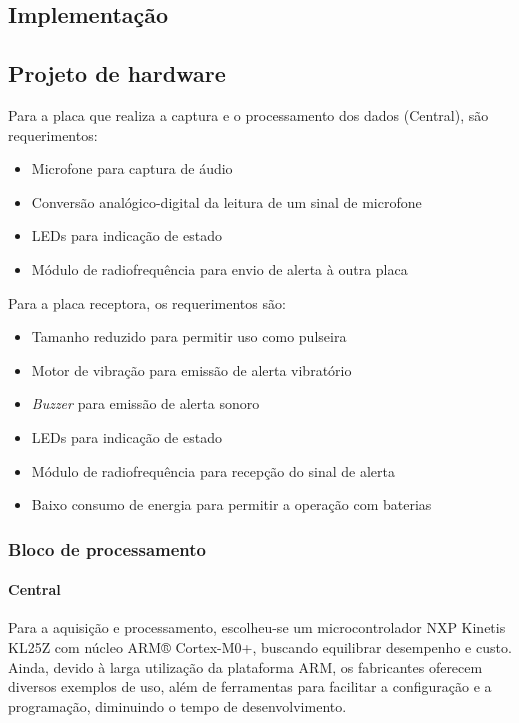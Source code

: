 \documentclass[10pt,a4paper]{article}
\begin{document}
\begin{multicols*}{2}
\section{Implementação}

\subsection{Projeto de hardware}
		
Para a placa que realiza a captura e o processamento dos dados (Central), são requerimentos:
\begin{itemize}
  \setlength\itemsep{0em}

	\item Microfone para captura de áudio
	\item Conversão analógico-digital da leitura de um sinal de microfone
	\item LEDs para indicação de estado
	\item Módulo de radiofrequência para envio de alerta à outra placa
\end{itemize}
		
				
Para a placa receptora, os requerimentos são:
\begin{itemize}
  \setlength\itemsep{0em}
	\item Tamanho reduzido para permitir uso como pulseira
	\item Motor de vibração para emissão de alerta vibratório
	\item \textit{Buzzer} para emissão de alerta sonoro
	\item LEDs para indicação de estado
	\item Módulo de radiofrequência para recepção do sinal de alerta
	\item Baixo consumo de energia para permitir a operação com baterias
\end{itemize}
\subsubsection{Bloco de processamento}
\paragraph{Central}
Para a aquisição e processamento, escolheu-se um microcontrolador NXP Kinetis KL25Z com núcleo ARM® Cortex-M0+, buscando equilibrar desempenho e custo. Ainda, devido à larga utilização da plataforma ARM, os fabricantes oferecem diversos exemplos de uso, além de ferramentas para facilitar a configuração e a programação, diminuindo o tempo de desenvolvimento.


\end{multicols*}
\end{document}
